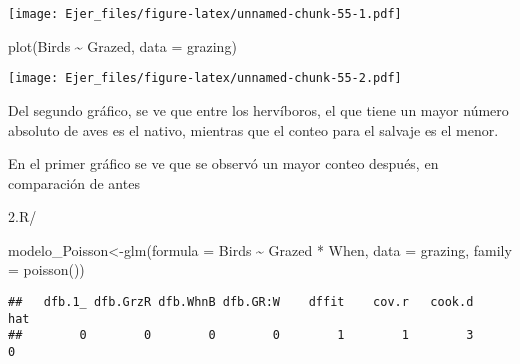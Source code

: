 \documentclass[
]{article}
\newenvironment{Shaded}{\begin{snugshade}}{\end{snugshade}}
\newcommand{\AttributeTok}[1]{\textcolor[rgb]{0.77,0.63,0.00}{#1}}
\newcommand{\DecValTok}[1]{\textcolor[rgb]{0.00,0.00,0.81}{#1}}
\newcommand{\FunctionTok}[1]{\textcolor[rgb]{0.00,0.00,0.00}{#1}}
\newcommand{\NormalTok}[1]{#1}
\newcommand{\OtherTok}[1]{\textcolor[rgb]{0.56,0.35,0.01}{#1}}
\newcommand{\SpecialCharTok}[1]{\textcolor[rgb]{0.00,0.00,0.00}{#1}}
\begin{document}
\texttt{[image: Ejer\_files/figure-latex/unnamed-chunk-55-1.pdf]}

\begin{Shaded}
\begin{Highlighting}[]
\FunctionTok{plot}\NormalTok{(Birds }\SpecialCharTok{\textasciitilde{}}\NormalTok{ Grazed, }\AttributeTok{data =}\NormalTok{ grazing)}
\end{Highlighting}
\end{Shaded}

\texttt{[image: Ejer\_files/figure-latex/unnamed-chunk-55-2.pdf]}

Del segundo gráfico, se ve que entre los hervíboros, el que tiene un
mayor número absoluto de aves es el nativo, mientras que el conteo para
el salvaje es el menor.

En el primer gráfico se ve que se observó un mayor conteo después, en
comparación de antes

2.R/

\begin{Shaded}
\begin{Highlighting}[]
\NormalTok{modelo\_Poisson}\OtherTok{\textless{}{-}}\FunctionTok{glm}\NormalTok{(}\AttributeTok{formula =}\NormalTok{ Birds }\SpecialCharTok{\textasciitilde{}}\NormalTok{ Grazed }\SpecialCharTok{*}\NormalTok{ When, }\AttributeTok{data =}\NormalTok{ grazing, }\AttributeTok{family =} \FunctionTok{poisson}\NormalTok{())}
\end{Highlighting}
\end{Shaded}

\begin{Shaded}
\end{Shaded}

\begin{verbatim}
##   dfb.1_ dfb.GrzR dfb.WhnB dfb.GR:W    dffit    cov.r   cook.d      hat 
##        0        0        0        0        1        1        3        0
\end{verbatim}

\begin{Shaded}
\end{Shaded}
\end{document}
